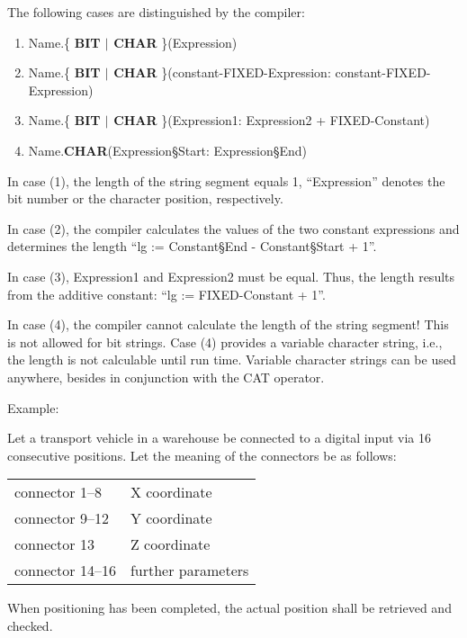 The following cases are distinguished by the compiler:
\begin{enumerate}
\item Name.\{ {\bf BIT $\mid$ CHAR} \}(Expression)
\item Name.\{ {\bf BIT $\mid$ CHAR} \}(constant-FIXED-Expression: constant-FIXED-Expression)
\item Name.\{ {\bf BIT $\mid$ CHAR} \}(Expression1: Expression2 + FIXED-Constant)
\item Name.{\bf CHAR}(Expression\S Start: Expression\S End)
\end{enumerate}

In case (1), the length of the string segment equals 1, ``Expression''
denotes the bit number or the character position, respectively.

In case (2), the compiler calculates the values of the two constant
expressions and determines the length ``lg := Constant\S End -
Constant\S Start + 1''.

In case (3), Expression1 and Expression2 must be equal. Thus, the length
results from the additive constant: ``lg := FIXED-Constant + 1''.

In case (4), the compiler cannot calculate the length of the string
segment! This is not allowed for bit strings. Case (4) provides a
variable character string, i.e., the length is not calculable until run
time. Variable character strings can be used anywhere, besides in
conjunction with the CAT operator.

Example:

Let a transport vehicle in a warehouse be connected to a digital input
via 16 consecutive positions. Let the meaning of the connectors be as
follows:

\begin{tabular}{l@{ : }l}
connector 1--8   & X coordinate\\
connector 9--12  & Y coordinate\\
connector 13     & Z coordinate\\
connector 14--16 & further parameters
\end{tabular}

When positioning has been completed, the actual position shall be
retrieved and checked.

